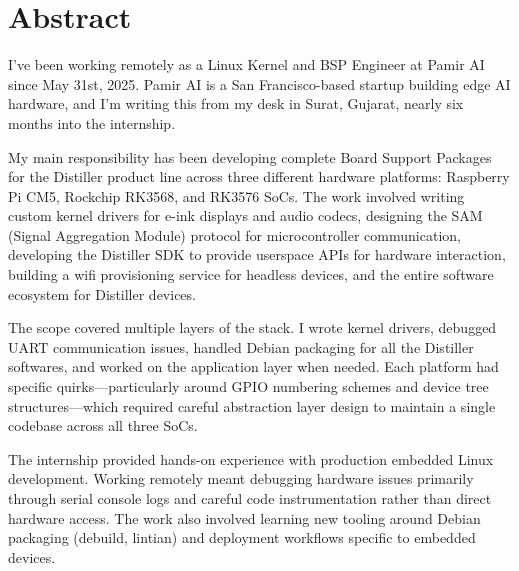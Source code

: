 \documentclass[12pt,a4paper]{report}
\begin{document}
\newpage
\chapter*{Abstract}

\vspace{1cm}

I've been working remotely as a Linux Kernel and BSP Engineer at Pamir AI since May 31st, 2025. Pamir AI is a San Francisco-based startup building edge AI hardware, and I'm writing this from my desk in Surat, Gujarat, nearly six months into the internship.

\vspace{0.5cm}

My main responsibility has been developing complete Board Support Packages for the Distiller product line across three different hardware platforms: Raspberry Pi CM5, Rockchip RK3568, and RK3576 SoCs. The work involved writing custom kernel drivers for e-ink displays and audio codecs, designing the SAM (Signal Aggregation Module) protocol for microcontroller communication, developing the Distiller SDK to provide userspace APIs for hardware interaction, building a wifi provisioning service for headless devices, and the entire software ecosystem for Distiller devices.

\vspace{0.5cm}

The scope covered multiple layers of the stack. I wrote kernel drivers, debugged UART communication issues, handled Debian packaging for all the Distiller softwares, and worked on the application layer when needed. Each platform had specific quirks—particularly around GPIO numbering schemes and device tree structures—which required careful abstraction layer design to maintain a single codebase across all three SoCs.

\vspace{0.5cm}

The internship provided hands-on experience with production embedded Linux development. Working remotely meant debugging hardware issues primarily through serial console logs and careful code instrumentation rather than direct hardware access. The work also involved learning new tooling around Debian packaging (debuild, lintian) and deployment workflows specific to embedded devices.

\vspace{1cm}
\end{document}
